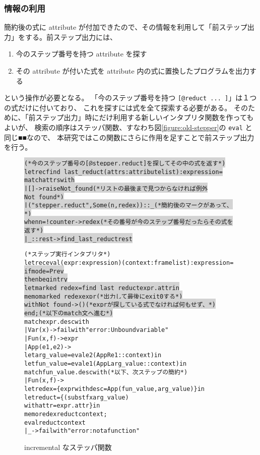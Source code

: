 \subsubsection{情報の利用}
簡約後の式に attribute が付加できたので、その情報を利用して「前ステップ出力」をする。前ステップ出力には、
\begin{enumerate}
\item 今のステップ番号を持つ attribute を探す
\item その attribute が付いた式を attribute 内の式に置換したプログラムを出力する
\end{enumerate}
という操作が必要となる。
「今のステップ番号を持つ \texttt{[@reduct ... ]}」は１つの式だけに付いており、
これを探すには式を全て探索する必要がある。
そのために、「前ステップ出力」時にだけ利用する新しいインタプリタ関数を作ってもよいが、
検索の順序はステッパ関数、すなわち図\ref{figure:old-stepper}の \texttt{eval} と同じ■■なので、
本研究ではこの関数にさらに作用を足すことで前ステップ出力を行う。

\begin{figure}
\begin{spacing}{0.8}
\begin{alltt}
\colorbox{lightgray}{ (* 今のステップ番号の [@stepper.reduct] を探してその中の式を返す *)}
\colorbox{lightgray}{let rec find\_last\_reduct (attrs : attribute list) : expression =}
\colorbox{lightgray}{  match attrs with}
\colorbox{lightgray}{  | [] -> raise Not\_found      (* リストの最後まで見つからなければ例外 Not\_found *)}
\colorbox{lightgray}{  | ("stepper.reduct", Some (n, redex)) :: \_        (* 簡約後のマークがあって、 *)}
\colorbox{lightgray}{    when n = !counter -> redex (* その番号が今のステップ番号だったらその式を返す *)}
\colorbox{lightgray}{  | \_ :: rest -> find\_last\_reduct rest}

(* ステップ実行インタプリタ *)
let rec eval (expr : expression) (context : frame list) : expression =
\colorbox{lightgray}{  if mode = Prev}
\colorbox{lightgray}{  then begin try}
\colorbox{lightgray}{      let marked\_redex = find\_last\_reduct expr.attr in}
\colorbox{lightgray}{      memo marked\_redex expr                     (* 出力して最後に exit 0 する *)}
\colorbox{lightgray}{    with Not\_found -> ()             (* expr が探している式でなければ何もせず、 *)}
\colorbox{lightgray}{  end;                                               (* 以下の match 文へ進む *)}
  match expr.desc with
    | Var (x) -> failwith "error: Unbound variable"
    | Fun (x, f) -> expr
    | App (e1, e2) ->
      let arg\_value = eval e2 (AppR e1 :: context) in
      let fun\_value = eval e1 (AppL arg\_value :: context) in
      match fun\_value.desc with                       (* 以下、次ステップの簡約 *)
        | Fun (x, f) ->
          let redex = \{expr with desc = App (fun\_value, arg\_value)\} in
          let reduct = \{(subst f x arg\_value)
                        with attr = expr.attr\} in
          memo redex reduct context;
          eval reduct context
        | \_ -> failwith "error: not a function"
\end{alltt}
\end{spacing}
\caption{incremental なステッパ関数}
\label{figure:new-stepper}
\end{figure}

